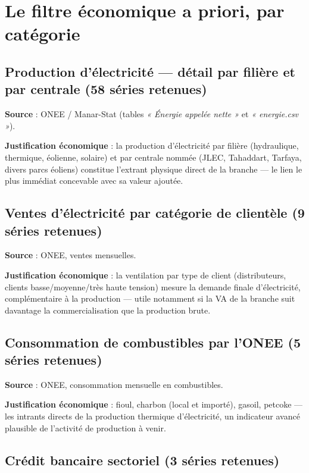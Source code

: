 \documentclass[11pt,a4paper]{article}
\begin{document}
\section{Le filtre économique a priori, par catégorie}

\subsection{Production d'électricité --- détail par filière et par centrale (58 séries retenues)}

\textbf{Source} : ONEE / Manar-Stat (tables \textit{« Énergie appelée nette »} et \textit{« energie.csv »}).

\textbf{Justification économique} : la production d'électricité par filière (hydraulique, thermique, éolienne, solaire) et par centrale nommée (JLEC, Tahaddart, Tarfaya, divers parcs éoliens) constitue l'extrant physique direct de la branche --- le lien le plus immédiat concevable avec sa valeur ajoutée.

\subsection{Ventes d'électricité par catégorie de clientèle (9 séries retenues)}

\textbf{Source} : ONEE, ventes mensuelles.

\textbf{Justification économique} : la ventilation par type de client (distributeurs, clients basse/moyenne/très haute tension) mesure la demande finale d'électricité, complémentaire à la production --- utile notamment si la VA de la branche suit davantage la commercialisation que la production brute.

\subsection{Consommation de combustibles par l'ONEE (5 séries retenues)}

\textbf{Source} : ONEE, consommation mensuelle en combustibles.

\textbf{Justification économique} : fioul, charbon (local et importé), gasoil, petcoke --- les intrants directs de la production thermique d'électricité, un indicateur avancé plausible de l'activité de production à venir.

\subsection{Crédit bancaire sectoriel (3 séries retenues)}
\end{document}
